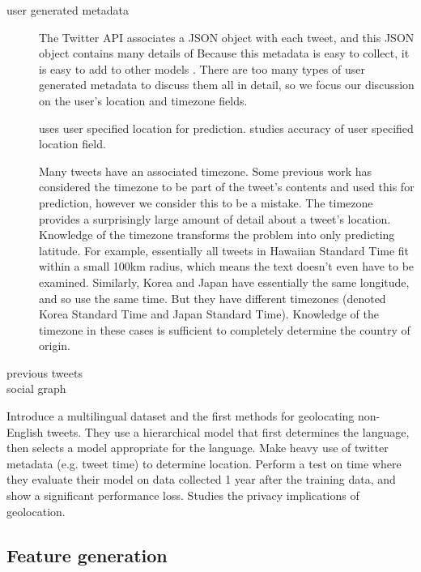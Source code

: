 \documentclass{article}
\begin{document}
\begin{description}
    \item[user generated metadata] 
        The Twitter API associates a JSON object with each tweet,
        and this JSON object contains many details of
        Because this metadata is easy to collect,
        it is easy to add to other models \citep{han2014text}.
        There are too many types of user generated metadata to discuss them all in detail,
        so we focus our discussion on the user's location and timezone fields.

        \citet{schulz2013multi} uses user specified location for prediction.
        \citet{hecht2011tweets} studies accuracy of user specified location field.

        Many tweets have an associated timezone.
        Some previous work \citep{schulz2013multi,han2014text} has considered the timezone to be part of the tweet's contents and used this for prediction,
        however we consider this to be a mistake.
        The timezone provides a surprisingly large amount of detail about a tweet's location.
        Knowledge of the timezone transforms the problem into only predicting latitude.
        For example, essentially all tweets in Hawaiian Standard Time fit within a small 100km radius, which means the text doesn't even have to be examined.
        Similarly, Korea and Japan have essentially the same longitude, and so use the same time.
        But they have different timezones (denoted Korea Standard Time and Japan Standard Time).
        Knowledge of the timezone in these cases is sufficient to completely determine the country of origin.
        
    \item[previous tweets]
    \item[social graph]
\end{description}

Introduce a multilingual dataset and the first methods for geolocating non-English tweets.
They use a hierarchical model that first determines the language,
then selects a model appropriate for the language.
Make heavy use of twitter metadata (e.g. tweet time) to determine location.
Perform a test on time where they evaluate their model on data collected 1 year after the training data, and show a significant performance loss.
Studies the privacy implications of geolocation.

\subsection{Feature generation}
\end{document}
